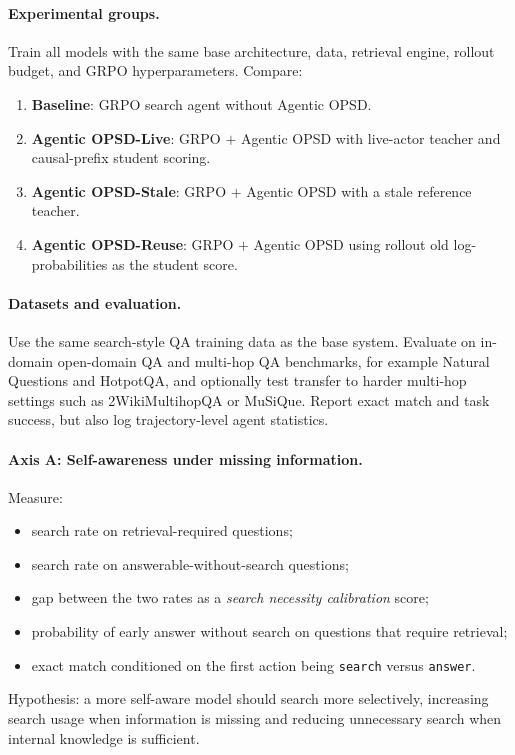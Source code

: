 \documentclass[11pt]{article}
\newcommand{\method}{Agentic OPSD}
\newcommand{\grpo}{GRPO}
\begin{document}
\paragraph{Experimental groups.}
Train all models with the same base architecture, data, retrieval engine, rollout budget, and \grpo{} hyperparameters. Compare:
\begin{enumerate}[leftmargin=1.5em]
    \item \textbf{Baseline}: \grpo{} search agent without Agentic OPSD.
    \item \textbf{\method{}-Live}: \grpo{} $+$ Agentic OPSD with live-actor teacher and causal-prefix student scoring.
    \item \textbf{\method{}-Stale}: \grpo{} $+$ Agentic OPSD with a stale reference teacher.
    \item \textbf{\method{}-Reuse}: \grpo{} $+$ Agentic OPSD using rollout old log-probabilities as the student score.
\end{enumerate}

\paragraph{Datasets and evaluation.}
Use the same search-style QA training data as the base system. Evaluate on in-domain open-domain QA and multi-hop QA benchmarks, for example Natural Questions and HotpotQA, and optionally test transfer to harder multi-hop settings such as 2WikiMultihopQA or MuSiQue. Report exact match and task success, but also log trajectory-level agent statistics.

\paragraph{Axis A: Self-awareness under missing information.}
Measure:
\begin{itemize}[leftmargin=1.5em]
    \item search rate on retrieval-required questions;
    \item search rate on answerable-without-search questions;
    \item gap between the two rates as a \emph{search necessity calibration} score;
    \item probability of early answer without search on questions that require retrieval;
    \item exact match conditioned on the first action being \texttt{search} versus \texttt{answer}.
\end{itemize}
Hypothesis: a more self-aware model should search more selectively, increasing search usage when information is missing and reducing unnecessary search when internal knowledge is sufficient.
\end{document}
